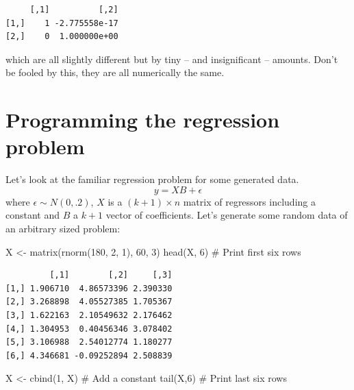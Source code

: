 \documentclass[
  letterpaper,
]{book}
\newenvironment{Shaded}{\begin{snugshade}}{\end{snugshade}}
\newcommand{\CommentTok}[1]{\textcolor[rgb]{0.37,0.37,0.37}{#1}}
\newcommand{\DecValTok}[1]{\textcolor[rgb]{0.68,0.00,0.00}{#1}}
\newcommand{\FunctionTok}[1]{\textcolor[rgb]{0.28,0.35,0.67}{#1}}
\newcommand{\NormalTok}[1]{\textcolor[rgb]{0.00,0.23,0.31}{#1}}
\newcommand{\OtherTok}[1]{\textcolor[rgb]{0.00,0.23,0.31}{#1}}
\begin{document}
\begin{verbatim}
     [,1]          [,2]
[1,]    1 -2.775558e-17
[2,]    0  1.000000e+00
\end{verbatim}

which are all slightly different but by tiny -- and insignificant --
amounts. Don't be fooled by this, they are all numerically the same.

\hypertarget{programming-the-regression-problem}{%
\section{Programming the regression
problem}\label{programming-the-regression-problem}}

Let's look at the familiar regression problem for some generated data.
\begin{equation}
  y = XB + \epsilon
\end{equation} where \(\epsilon \sim N(0,.2)\), \(X\) is a
\((k+1)\times n\) matrix of regressors including a constant and \(B\) a
\(k+1\) vector of coefficients. Let's generate some random data of an
arbitrary sized problem:

\begin{Shaded}
\begin{Highlighting}[]
\NormalTok{X }\OtherTok{\textless{}{-}} \FunctionTok{matrix}\NormalTok{(}\FunctionTok{rnorm}\NormalTok{(}\DecValTok{180}\NormalTok{, }\DecValTok{2}\NormalTok{, }\DecValTok{1}\NormalTok{), }\DecValTok{60}\NormalTok{, }\DecValTok{3}\NormalTok{)}
\FunctionTok{head}\NormalTok{(X, }\DecValTok{6}\NormalTok{) }\CommentTok{\# Print first six rows}
\end{Highlighting}
\end{Shaded}

\begin{verbatim}
         [,1]        [,2]     [,3]
[1,] 1.906710  4.86573396 2.390330
[2,] 3.268898  4.05527385 1.705367
[3,] 1.622163  2.10549632 2.176462
[4,] 1.304953  0.40456346 3.078402
[5,] 3.106988  2.54012774 1.180277
[6,] 4.346681 -0.09252894 2.508839
\end{verbatim}

\begin{Shaded}
\begin{Highlighting}[]
\NormalTok{X }\OtherTok{\textless{}{-}} \FunctionTok{cbind}\NormalTok{(}\DecValTok{1}\NormalTok{, X) }\CommentTok{\# Add a constant}
\FunctionTok{tail}\NormalTok{(X,}\DecValTok{6}\NormalTok{) }\CommentTok{\# Print last six rows}
\end{Highlighting}
\end{Shaded}
\end{document}
